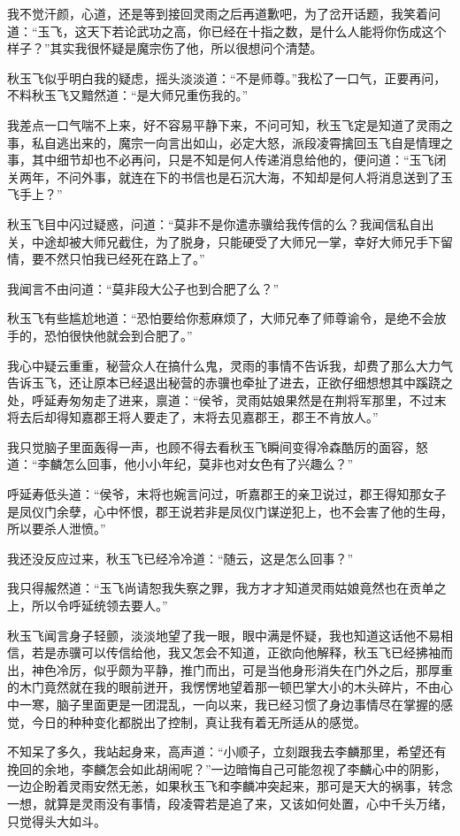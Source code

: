 我不觉汗颜，心道，还是等到接回灵雨之后再道歉吧，为了岔开话题，我笑着问道：“玉飞，这天下若论武功之高，你已经在十指之数，是什么人能将你伤成这个样子？”其实我很怀疑是魔宗伤了他，所以很想问个清楚。

秋玉飞似乎明白我的疑虑，摇头淡淡道：“不是师尊。”我松了一口气，正要再问，不料秋玉飞又黯然道：“是大师兄重伤我的。”

我差点一口气喘不上来，好不容易平静下来，不问可知，秋玉飞定是知道了灵雨之事，私自逃出来的，魔宗一向言出如山，必定大怒，派段凌霄擒回玉飞自是情理之事，其中细节却也不必再问，只是不知是何人传递消息给他的，便问道：“玉飞闭关两年，不问外事，就连在下的书信也是石沉大海，不知却是何人将消息送到了玉飞手上？”

秋玉飞目中闪过疑惑，问道：“莫非不是你遣赤骥给我传信的么？我闻信私自出关，中途却被大师兄截住，为了脱身，只能硬受了大师兄一掌，幸好大师兄手下留情，要不然只怕我已经死在路上了。”

我闻言不由问道：“莫非段大公子也到合肥了么？”

秋玉飞有些尴尬地道：“恐怕要给你惹麻烦了，大师兄奉了师尊谕令，是绝不会放手的，恐怕很快他就会到合肥了。”

我心中疑云重重，秘营众人在搞什么鬼，灵雨的事情不告诉我，却费了那么大力气告诉玉飞，还让原本已经退出秘营的赤骥也牵扯了进去，正欲仔细想想其中蹊跷之处，呼延寿匆匆走了进来，禀道：“侯爷，灵雨姑娘果然是在荆将军那里，不过末将去后却得知嘉郡王将人要走了，末将去见嘉郡王，郡王不肯放人。”

我只觉脑子里面轰得一声，也顾不得去看秋玉飞瞬间变得冷森酷厉的面容，怒道：“李麟怎么回事，他小小年纪，莫非也对女色有了兴趣么？”

呼延寿低头道：“侯爷，末将也婉言问过，听嘉郡王的亲卫说过，郡王得知那女子是凤仪门余孽，心中怀恨，郡王说若非是凤仪门谋逆犯上，也不会害了他的生母，所以要杀人泄愤。”

我还没反应过来，秋玉飞已经冷冷道：“随云，这是怎么回事？”

我只得赧然道：“玉飞尚请恕我失察之罪，我方才才知道灵雨姑娘竟然也在贡单之上，所以令呼延统领去要人。”

秋玉飞闻言身子轻颤，淡淡地望了我一眼，眼中满是怀疑，我也知道这话他不易相信，若是赤骥可以传信给他，我又怎会不知道，正欲向他解释，秋玉飞已经拂袖而出，神色冷厉，似乎颇为平静，推门而出，可是当他身形消失在门外之后，那厚重的木门竟然就在我的眼前迸开，我愣愣地望着那一顿巴掌大小的木头碎片，不由心中一寒，脑子里面更是一团混乱，一向以来，我已经习惯了身边事情尽在掌握的感觉，今日的种种变化都脱出了控制，真让我有着无所适从的感觉。

不知呆了多久，我站起身来，高声道：“小顺子，立刻跟我去李麟那里，希望还有挽回的余地，李麟怎会如此胡闹呢？”一边暗悔自己可能忽视了李麟心中的阴影，一边企盼着灵雨安然无恙，如果秋玉飞和李麟冲突起来，那可是天大的祸事，转念一想，就算是灵雨没有事情，段凌霄若是追了来，又该如何处置，心中千头万绪，只觉得头大如斗。

